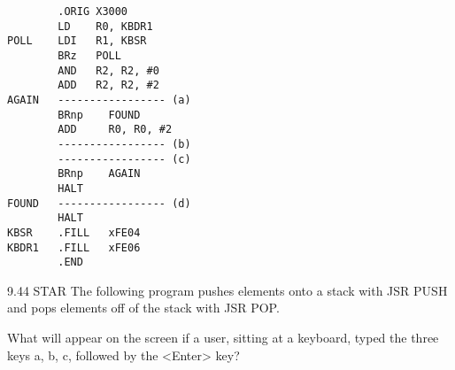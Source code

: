 \documentclass{patt}
\begin{document}
\begin{exercises}
\begin{verbatim}
        .ORIG X3000
        LD    R0, KBDR1
POLL    LDI   R1, KBSR
        BRz   POLL
        AND   R2, R2, #0
        ADD   R2, R2, #2
AGAIN   ----------------- (a)
        BRnp    FOUND
        ADD     R0, R0, #2
        ----------------- (b)
        ----------------- (c)
        BRnp    AGAIN
        HALT
FOUND   ----------------- (d)
        HALT
KBSR    .FILL   xFE04
KBDR1   .FILL   xFE06
        .END
\end{verbatim}

\item[9.44]STAR The following program pushes elements onto a stack with JSR PUSH and pops elements off of the stack with JSR POP. \\

\begin{center}
\begin{minipage}[t]{0.5\linewidth}
\end{minipage}
\end{center}

\noindent
What will appear on the screen if a user, sitting at a keyboard,
typed the three keys a, b, c, followed by the \textless Enter\textgreater { }key? \\ 


\end{exercises}
\end{document}

